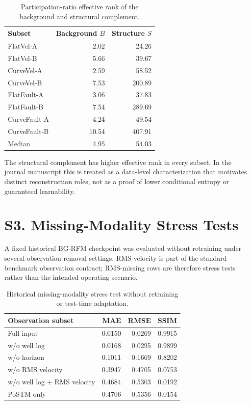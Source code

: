 \documentclass[remotesensing,supfile,submit,pdftex,moreauthors]{Definitions/mdpi}
\begin{document}
\begin{table}[t]
\centering
\caption{Participation-ratio effective rank of the background and structural complement.}
\begin{tabular}{lrr}
\toprule
Subset & Background $B$ & Structure $S$ \\
\midrule
FlatVel-A & 2.02 & 24.26 \\
FlatVel-B & 5.66 & 39.67 \\
CurveVel-A & 2.59 & 58.52 \\
CurveVel-B & 7.53 & 200.89 \\
FlatFault-A & 3.06 & 37.83 \\
FlatFault-B & 7.54 & 289.69 \\
CurveFault-A & 4.24 & 49.54 \\
CurveFault-B & 10.54 & 407.91 \\
\midrule
Median & 4.95 & 54.03 \\
\bottomrule
\end{tabular}
\end{table}

The structural complement has higher effective rank in every subset. In the journal manuscript this is treated as a data-level characterization that motivates distinct reconstruction roles, not as a proof of lower conditional entropy or guaranteed learnability.

\section{S3. Missing-Modality Stress Tests}

A fixed historical BG-RFM checkpoint was evaluated without retraining under several observation-removal settings. RMS velocity is part of the standard benchmark observation contract; RMS-missing rows are therefore stress tests rather than the intended operating scenario.

\begin{table}[t]
\centering
\caption{Historical missing-modality stress test without retraining or test-time adaptation.}
\begin{tabular}{lrrr}
\toprule
Observation subset & MAE & RMSE & SSIM \\
\midrule
Full input & 0.0150 & 0.0269 & 0.9915 \\
w/o well log & 0.0168 & 0.0295 & 0.9899 \\
w/o horizon & 0.1011 & 0.1669 & 0.8202 \\
w/o RMS velocity & 0.3947 & 0.4705 & 0.0753 \\
w/o well log + RMS velocity & 0.4684 & 0.5303 & 0.0192 \\
PoSTM only & 0.4706 & 0.5356 & 0.0154 \\
\bottomrule
\end{tabular}
\end{table}
\end{document}
